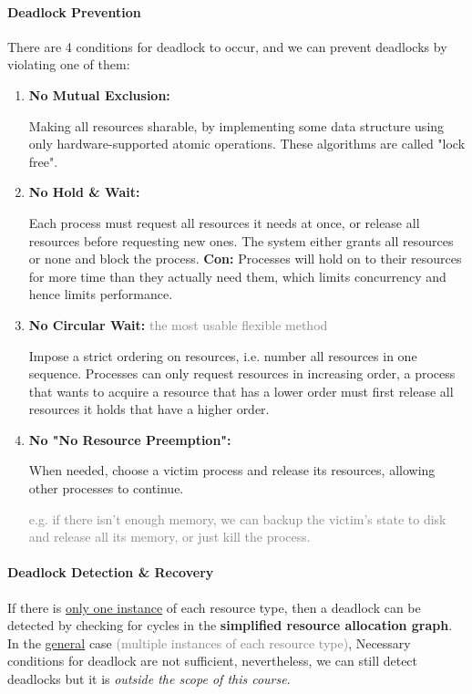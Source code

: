 \documentclass[openany,12pt]{book}
\newcommand{\gray}[1]{\textcolor{gray}{#1}}
\begin{document}
\paragraph{Deadlock Prevention} There are 4 conditions for deadlock to occur, and we can prevent deadlocks by violating one of them:
\begin{enumerate}
  \item \textbf{No Mutual Exclusion:} \par
        Making all resources sharable, by implementing some data structure using only hardware-supported atomic operations. These algorithms are called "lock free".

  \item \textbf{No Hold \& Wait:} \par
        Each process must request all resources it needs at once, or release all resources before requesting new ones. The system either grants all resources or none and block the process.
        \textbf{Con:} Processes will hold on to their resources for more time than they actually need them, which limits concurrency and hence limits performance.

  \item \textbf{No Circular Wait:} \gray{the most usable flexible method} \par
        Impose a strict ordering on resources, i.e. number all resources in one sequence. Processes can only request resources in increasing order, a process that wants to acquire a resource that has a lower order must first release all resources it holds that have a higher order.

  \item \textbf{No "No Resource Preemption":} \par
        When needed, choose a victim process and release its resources, allowing other processes to continue. \par
        \gray{e.g. if there isn't enough memory, we can backup the victim's state to disk and release all its memory, or just kill the process.}

\end{enumerate}

\paragraph{Deadlock Detection \& Recovery} If there is \ul{only one instance} of each resource type, then a deadlock can be detected by checking for cycles in the \textbf{simplified resource allocation graph}. In the \ul{general} case \gray{(multiple instances of each resource type)}, Necessary conditions for deadlock are not sufficient, nevertheless, we can still detect deadlocks but it is \textit{outside the scope of this course}. \par
\end{document}
